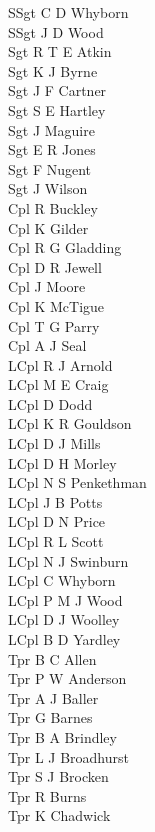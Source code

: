 \begin{multicols}{2}
  \noindent
  SSgt C D Whyborn \\
  SSgt J D Wood \\
  Sgt R T E Atkin \\
  Sgt K J Byrne \\
  Sgt J F Cartner \\
  Sgt S E Hartley \\
  Sgt J Maguire \\
  Sgt E R Jones \\
  Sgt F Nugent \\
  Sgt J Wilson \\
  Cpl R Buckley \\
  Cpl K Gilder \\
  Cpl R G Gladding \\
  Cpl D R Jewell \\
  Cpl J Moore \\
  Cpl K McTigue \\
  Cpl T G Parry \\
  Cpl A J Seal \\
  LCpl R J Arnold \\
  LCpl M E Craig \\
  LCpl D Dodd \\
  LCpl K R Gouldson \\
  LCpl D J Mills \\
  LCpl D H Morley \\
  LCpl N S Penkethman \\
  LCpl J B Potts \\
  LCpl D N Price \\
  LCpl R L Scott \\
  LCpl N J Swinburn \\
  LCpl C Whyborn \\
  LCpl P M J Wood \\
  LCpl D J Woolley \\
  LCpl B D Yardley \\
  Tpr B C Allen \\
  Tpr P W Anderson \\
  Tpr A J Baller \\
  Tpr G Barnes \\
  Tpr B A Brindley \\
  Tpr L J Broadhurst \\
  Tpr S J Brocken \\
  Tpr R Burns \\
  Tpr K Chadwick \\

\end{multicols}
